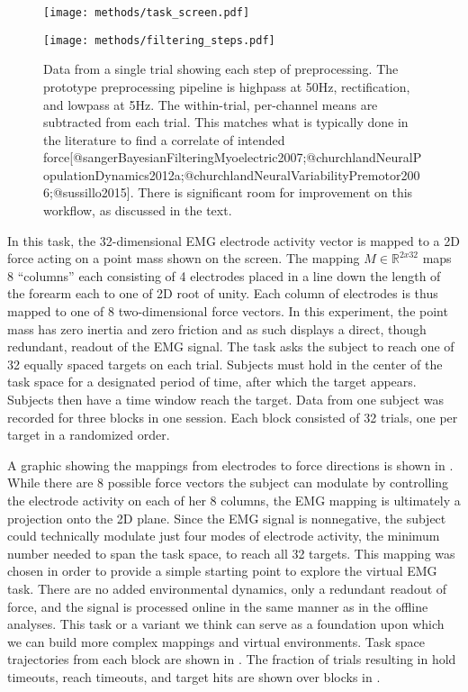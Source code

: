 \documentclass[../main.tex]{subfiles}
\begin{document}
\begin{figure}
  \centering
    \texttt{[image: methods/task\_screen.pdf]}
    \caption[Center-hold, Reach-out task visual feedback]{}\label{fig:task_task_screen}
  \end{figure}

\begin{figure}
  \centering
  \texttt{[image: methods/filtering\_steps.pdf]}
  \caption[Data filtering steps]{Data from a single trial showing each step of preprocessing. The prototype preprocessing pipeline is highpass at 50Hz, rectification, and lowpass at 5Hz. The within-trial, per-channel means are subtracted from each trial. This matches what is typically done in the literature to find a correlate of intended force[@sangerBayesianFilteringMyoelectric2007;@churchlandNeuralPopulationDynamics2012a;@churchlandNeuralVariabilityPremotor2006;@sussillo2015]. There is significant room for improvement on this workflow, as discussed in the text.}\label{fig:filtering}
\end{figure}

In this task, the 32-dimensional EMG electrode activity vector is mapped to a 2D force acting on a point mass shown on the screen. The mapping $M\in\mathbb{R}^{2 x 32}$ maps 8 ``columns'' each consisting of 4 electrodes placed in a line down the length of the forearm each to one of 2D root of unity. Each column of electrodes is thus mapped to one of 8 two-dimensional force vectors. In this experiment, the point mass has zero inertia and zero friction and as such displays a direct, though redundant, readout of the EMG signal. The task asks the subject to reach one of 32 equally spaced targets on each trial. Subjects must hold in the center of the task space for a designated period of time, after which the target appears. Subjects then have a time window reach the target. Data from one subject was recorded for three blocks in one session. Each block consisted of 32 trials, one per target in a randomized order.

A graphic showing the mappings from electrodes to force directions is shown in . While there are 8 possible force vectors the subject can modulate by controlling the electrode activity on each of her 8 columns, the EMG mapping is ultimately a projection onto the 2D plane. Since the EMG signal is nonnegative, the subject could technically modulate just four modes of electrode activity, the minimum number needed to span the task space, to reach all 32 targets. This mapping was chosen in order to provide a simple starting point to explore the virtual EMG task. There are no added environmental dynamics, only a redundant readout of force, and the signal is processed online in the same manner as in the offline analyses. This task or a variant we think can serve as a foundation upon which we can build more complex mappings and virtual environments. Task space trajectories from each block are shown in . The fraction of trials resulting in hold timeouts, reach timeouts, and target hits are shown over blocks in .
\end{document}
